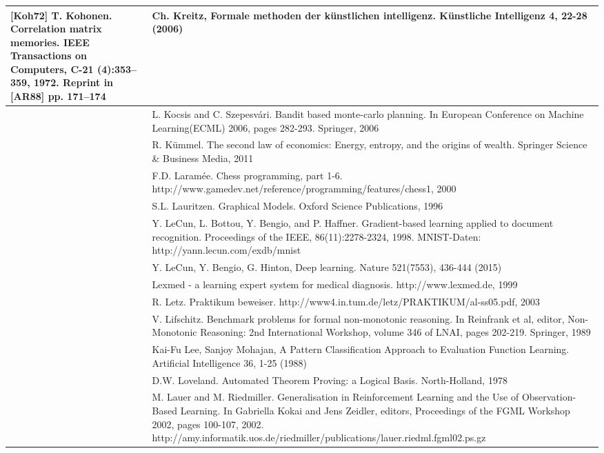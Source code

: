 \documentclass[10pt]{book}
\begin{document}
\begin{tabular}{|l|l|}
[Koh72] T. Kohonen. Correlation matrix memories. IEEE Transactions on Computers, C-21 (4):353–359, 1972. Reprint in [AR88] pp. 171–174
 & Ch. Kreitz, Formale methoden der künstlichen intelligenz. Künstliche Intelligenz 4, 22-28 (2006) \\
\hline [KS06] & L. Kocsis and C. Szepesvári. Bandit based monte-carlo planning. In European Conference on Machine Learning(ECML) 2006, pages 282-293. Springer, 2006 \\
\hline [Küm11] & R. Kümmel. The second law of economics: Energy, entropy, and the origins of wealth. Springer Science \& Business Media, 2011 \\
\hline [Lar00] & F.D. Laramée. Chess programming, part 1-6. http://www.gamedev.net/reference/programming/features/chess1, 2000 \\
\hline [\cite{lauritzen1996graphical}] & S.L. Lauritzen. Graphical Models. Oxford Science Publications, 1996 \\
\hline [LBBH98] & Y. LeCun, L. Bottou, Y. Bengio, and P. Haffner. Gradient-based learning applied to document recognition. Proceedings of the IEEE, 86(11):2278-2324, 1998. MNIST-Daten: http://yann.lecun.com/exdb/mnist \\
\hline [LBH15] & Y. LeCun, Y. Bengio, G. Hinton, Deep learning. Nature 521(7553), 436-444 (2015) \\
\hline [Le999] & Lexmed - a learning expert system for medical diagnosis. http://www.lexmed.de, 1999 \\
\hline [\cite{letz2003praktikum}] & R. Letz. Praktikum beweiser. http://www4.in.tum.de/letz/PRAKTIKUM/al-ss05.pdf, 2003 \\
\hline [\cite{lifschitz1989benchmark}] & V. Lifschitz. Benchmark problems for formal non-monotonic reasoning. In Reinfrank et al, editor, Non-Monotonic Reasoning: 2nd International Workshop, volume 346 of LNAI, pages 202-219. Springer, 1989 \\
\hline [\cite{lee1988evaluation}] & Kai-Fu Lee, Sanjoy Mohajan, A Pattern Classification Approach to Evaluation Function Learning. Artificial Intelligence 36, 1-25 (1988) \\
\hline [Lov78] & D.W. Loveland. Automated Theorem Proving: a Logical Basis. North-Holland, 1978 \\
\hline [\cite{lauer2002generalisation}] & M. Lauer and M. Riedmiller. Generalisation in Reinforcement Learning and the Use of Observation-Based Learning. In Gabriella Kokai and Jens Zeidler, editors, Proceedings of the FGML Workshop 2002, pages 100-107, 2002. http://amy.informatik.uos.de/riedmiller/publications/lauer.riedml.fgml02.ps.gz \\

\end{tabular}
\end{document}
